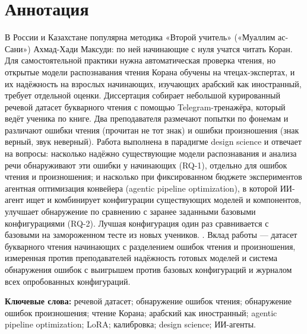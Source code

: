 \chapter*{Аннотация}
\thispagestyle{plain}

В России и Казахстане популярна методика «Второй учитель» («Муаллим ас-Сани») Ахмад-Хади Максуди: по ней
начинающие с нуля учатся читать Коран. Для самостоятельной практики нужна автоматическая проверка чтения, но
открытые модели распознавания чтения Корана обучены на чтецах-экспертах, и их надёжность на взрослых
начинающих, изучающих арабский как иностранный, требует отдельной оценки. Диссертация собирает небольшой
курированный речевой датасет букварного чтения с помощью Telegram-тренажёра, который ведёт ученика по книге. Два преподавателя размечают попытки по фонемам и различают ошибки чтения
(прочитан не тот знак) и ошибки произношения (знак верный, звук неверный). Работа выполнена в парадигме
design science и отвечает на вопросы: насколько надёжно существующие модели распознавания и анализа речи
обнаруживают эти ошибки у начинающих (RQ-1), отдельно для ошибок чтения и произношения; и насколько при
фиксированном бюджете экспериментов агентная оптимизация конвейера (agentic pipeline optimization), в которой
ИИ-агент ищет и комбинирует конфигурации существующих моделей и компонентов, улучшает обнаружение по сравнению
с заранее заданными базовыми конфигурациями (RQ-2). Лучшая конфигурация один раз сравнивается с базовыми на
замороженном тесте из новых учеников. . Вклад работы --- датасет букварного чтения начинающих с разделением ошибок
чтения и произношения, измеренная против преподавателей надёжность готовых моделей и система обнаружения
ошибок с выигрышем против базовых конфигураций и журналом всех опробованных конфигураций.

\medskip
\noindent\textbf{Ключевые слова:} речевой датасет; обнаружение ошибок чтения; обнаружение ошибок
произношения; чтение Корана; арабский как иностранный; agentic pipeline optimization; LoRA; калибровка;
design science; ИИ-агенты.


